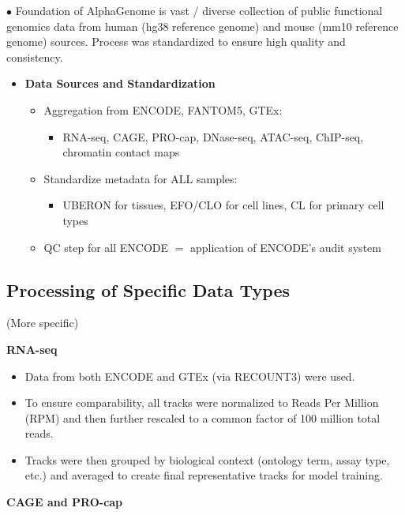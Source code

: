 \documentclass[../main.tex]{subfiles}
\begin{document}
\vspace{0.3cm}

$\bullet$ Foundation of AlphaGenome is vast / diverse collection of public functional genomics data from human (hg38 reference genome) and mouse (mm10 reference genome) sources. Process was standardized to ensure high quality and consistency.

\begin{itemize}
    \item \textbf{Data Sources and Standardization}
    \begin{itemize}
        \item Aggregation from ENCODE, FANTOM5, GTEx:
        \begin{itemize}
            \item RNA-seq, CAGE, PRO-cap, DNase-seq, ATAC-seq, ChIP-seq, chromatin contact maps
        \end{itemize}
        \item Standardize metadata for ALL samples:
        \begin{itemize}
            \item UBERON for tissues, EFO/CLO for cell lines, CL for primary cell types
        \end{itemize}
        \item QC step for all ENCODE $=$ application of ENCODE's audit system
    \end{itemize}
\end{itemize}



\subsection{Processing of Specific Data Types} (More specific)

\textbf{RNA-seq}

\begin{itemize}
    \item Data from both ENCODE and GTEx (via RECOUNT3) were used.
    \item To ensure comparability, all tracks were normalized to Reads Per Million (RPM) and then further rescaled to a common factor of 100 million total reads.
    \item Tracks were then grouped by biological context (ontology term, assay type, etc.) and averaged to create final representative tracks for model training.
\end{itemize}

\textbf{CAGE and PRO-cap}
\end{document}
